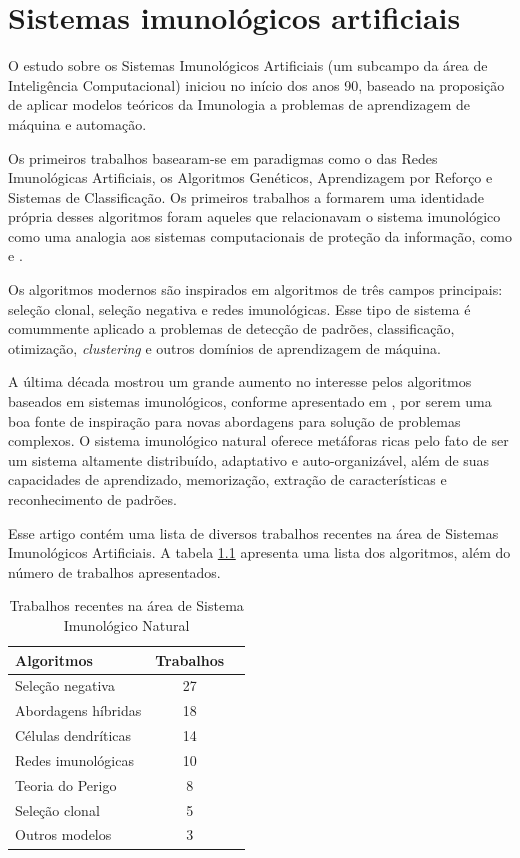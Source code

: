 \chapter{Sistemas imunológicos artificiais}

O estudo sobre os Sistemas Imunológicos Artificiais (um subcampo da área de Inteligência Computacional) iniciou no início dos anos 90, baseado na proposição de aplicar modelos teóricos da Imunologia a problemas de aprendizagem de máquina e automação.

Os primeiros trabalhos basearam-se em paradigmas como o das Redes Imunológicas Artificiais, os Algoritmos Genéticos, Aprendizagem por Reforço e Sistemas de Classificação. Os primeiros trabalhos a formarem uma identidade própria desses algoritmos foram aqueles que relacionavam o sistema imunológico como uma analogia aos sistemas computacionais de proteção da informação, como \citet{Forrest1994} e \citet{Forrest1997}.

Os algoritmos modernos são inspirados em algoritmos de três campos principais: seleção clonal, seleção negativa e redes imunológicas. Esse tipo de sistema é comummente aplicado a problemas de detecção de padrões, classificação, otimização, \emph{clustering} e outros domínios de aprendizagem de máquina.

A última década mostrou um grande aumento no interesse pelos algoritmos baseados em sistemas imunológicos, conforme apresentado em \citet{Dasgupta2010}, por serem uma boa fonte de inspiração para novas abordagens para solução de problemas complexos. O sistema imunológico natural oferece metáforas ricas pelo fato de ser um sistema altamente distribuído, adaptativo e auto-organizável, além de suas capacidades de aprendizado, memorização, extração de características e reconhecimento de padrões.

Esse artigo contém uma lista de diversos trabalhos recentes na área de Sistemas Imunológicos Artificiais. A tabela \ref{ais:recent} apresenta uma lista dos algoritmos, além do número de trabalhos apresentados.

\begin{table}[h!]
    \centering
    \caption{Trabalhos recentes na área de Sistema Imunológico Natural \cite{Dasgupta2010}}
    \begin{tabular}{l c r}
        \hline
        Algoritmos & Trabalhos   \\
        \hline
        Seleção negativa    & 27 \\
        Abordagens híbridas & 18 \\
        Células dendríticas & 14 \\
        Redes imunológicas  & 10 \\
        Teoria do Perigo    & 8  \\
        Seleção clonal      & 5  \\
        Outros modelos      & 3  \\
        \hline
    \end{tabular}
    \label{ais:recent}
\end{table}

